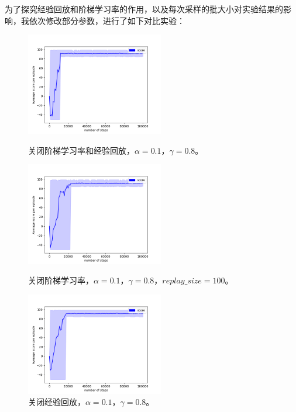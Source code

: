 \documentclass[a4paper,12pt]{article}
\begin{document}
\begin{CJK}{UTF8}{gbsn}
为了探究经验回放和阶梯学习率的作用，以及每次采样的批大小对实验结果的影响，我依次修改部分参数，进行了如下对比实验：
\begin{figure}[htbp]
	\centering
	\begin{minipage}[t]{0.45\textwidth}
		\centering
		\includegraphics[width=6cm]{code/performance_al=0.1_ga=0.8.png}
		\caption{\tiny 关闭阶梯学习率和经验回放，$\alpha=0.1$，$\gamma=0.8$。}
	\end{minipage}
	\hspace{0.5cm}
	\begin{minipage}[t]{0.45\textwidth}
		\centering
		\includegraphics[width=6cm]{code/performance_al=0.1_ga=0.8_rs=100.png}
		\caption{\tiny 关闭阶梯学习率，$\alpha=0.1$，$\gamma=0.8$，$replay\_size=100$。}
	\end{minipage}
	\hspace{0.5cm}
	\begin{minipage}[t]{0.45\textwidth}
		\centering
		\includegraphics[width=6cm]{code/performance_al=0.1_ga=0.8_laal=T.png}
		\caption{\tiny 关闭经验回放，$\alpha=0.1$，$\gamma=0.8$。}
	\end{minipage}
	\hspace{0.5cm}

\end{figure}
\end{CJK}
\end{document}
